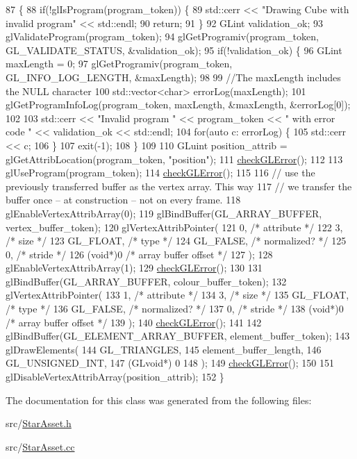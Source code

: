 \begin{DoxyCode}
87                                          \{
88   \textcolor{keywordflow}{if}(!glIsProgram(program\_token)) \{
89     std::cerr << \textcolor{stringliteral}{"Drawing Cube with invalid program"} << std::endl;
90     \textcolor{keywordflow}{return};
91   \}
92   GLint validation\_ok;
93   glValidateProgram(program\_token);
94   glGetProgramiv(program\_token, GL\_VALIDATE\_STATUS, &validation\_ok);
95   \textcolor{keywordflow}{if}(!validation\_ok) \{
96     GLint maxLength = 0;
97     glGetProgramiv(program\_token, GL\_INFO\_LOG\_LENGTH, &maxLength);
98 
99     \textcolor{comment}{//The maxLength includes the NULL character}
100     std::vector<char> errorLog(maxLength);
101     glGetProgramInfoLog(program\_token, maxLength, &maxLength, &errorLog[0]);
102 
103     std::cerr << \textcolor{stringliteral}{"Invalid program "} << program\_token << \textcolor{stringliteral}{" with error code "} << validation\_ok << std::endl;
104     \textcolor{keywordflow}{for}(\textcolor{keyword}{auto} c: errorLog) \{
105       std::cerr << c;
106     \}
107     exit(-1);
108   \}
109 
110   GLuint position\_attrib = glGetAttribLocation(program\_token, \textcolor{stringliteral}{"position"});
111   \hyperlink{StarAsset_8cc_a75f201b0e53e68726854997957322b8d}{checkGLError}();
112 
113   glUseProgram(program\_token);
114   \hyperlink{StarAsset_8cc_a75f201b0e53e68726854997957322b8d}{checkGLError}();
115 
116   \textcolor{comment}{// use the previously transferred buffer as the vertex array.  This way}
117   \textcolor{comment}{// we transfer the buffer once -- at construction -- not on every frame.}
118   glEnableVertexAttribArray(0);
119   glBindBuffer(GL\_ARRAY\_BUFFER, vertex\_buffer\_token);
120   glVertexAttribPointer(
121     0,        \textcolor{comment}{/* attribute */}
122     3,        \textcolor{comment}{/* size */}
123     GL\_FLOAT,   \textcolor{comment}{/* type */}
124     GL\_FALSE,   \textcolor{comment}{/* normalized? */}
125     0,        \textcolor{comment}{/* stride */}
126     (\textcolor{keywordtype}{void}*)0    \textcolor{comment}{/* array buffer offset */}
127   );
128   glEnableVertexAttribArray(1);
129   \hyperlink{StarAsset_8cc_a75f201b0e53e68726854997957322b8d}{checkGLError}();
130 
131   glBindBuffer(GL\_ARRAY\_BUFFER, colour\_buffer\_token);
132   glVertexAttribPointer(
133     1,        \textcolor{comment}{/* attribute */}
134     3,        \textcolor{comment}{/* size */}
135     GL\_FLOAT,   \textcolor{comment}{/* type */}
136     GL\_FALSE,   \textcolor{comment}{/* normalized? */}
137     0,        \textcolor{comment}{/* stride */}
138     (\textcolor{keywordtype}{void}*)0    \textcolor{comment}{/* array buffer offset */}
139   );
140   \hyperlink{StarAsset_8cc_a75f201b0e53e68726854997957322b8d}{checkGLError}();
141 
142   glBindBuffer(GL\_ELEMENT\_ARRAY\_BUFFER, element\_buffer\_token);
143   glDrawElements(
144     GL\_TRIANGLES,
145     element\_buffer\_length,
146     GL\_UNSIGNED\_INT,
147     (GLvoid*) 0
148   );
149   \hyperlink{StarAsset_8cc_a75f201b0e53e68726854997957322b8d}{checkGLError}();
150 
151   glDisableVertexAttribArray(position\_attrib);
152 \}
\end{DoxyCode}


The documentation for this class was generated from the following files\+:\begin{DoxyCompactItemize}
\item 
src/\hyperlink{StarAsset_8h}{Star\+Asset.\+h}\item 
src/\hyperlink{StarAsset_8cc}{Star\+Asset.\+cc}\end{DoxyCompactItemize}
